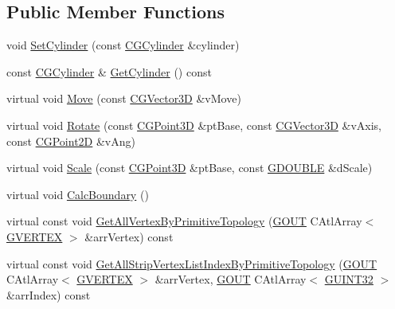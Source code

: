 \subsection*{Public Member Functions}
\begin{DoxyCompactItemize}
\item 
void \hyperlink{class_c_g_object_cylinder_a3e26bc75ed3f1074c950b257f7b0b9af}{Set\+Cylinder} (const \hyperlink{class_c_g_cylinder}{C\+G\+Cylinder} \&cylinder)
\item 
const \hyperlink{class_c_g_cylinder}{C\+G\+Cylinder} \& \hyperlink{class_c_g_object_cylinder_a2919a0a7a51b4e76b765916722580856}{Get\+Cylinder} () const 
\item 
virtual void \hyperlink{class_c_g_object_cylinder_a45bd850435a43f7db3fcfb5dce66aab3}{Move} (const \hyperlink{_g_point3_d_8h_aa7e73d39f4c991acb5a13c84b498366d}{C\+G\+Vector3\+D} \&v\+Move)
\item 
virtual void \hyperlink{class_c_g_object_cylinder_ae9c520523f6383d5632b0254e60c75d6}{Rotate} (const \hyperlink{class_c_g_point3_d}{C\+G\+Point3\+D} \&pt\+Base, const \hyperlink{_g_point3_d_8h_aa7e73d39f4c991acb5a13c84b498366d}{C\+G\+Vector3\+D} \&v\+Axis, const \hyperlink{class_c_g_point2_d}{C\+G\+Point2\+D} \&v\+Ang)
\item 
virtual void \hyperlink{class_c_g_object_cylinder_a834e94a7629f467684e3809612a00277}{Scale} (const \hyperlink{class_c_g_point3_d}{C\+G\+Point3\+D} \&pt\+Base, const \hyperlink{_g_types_8h_afd05ac85f90ee8e2a733928545462cd4}{G\+D\+O\+U\+B\+L\+E} \&d\+Scale)
\item 
virtual void \hyperlink{class_c_g_object_cylinder_a129d8acdb84a92f16b6700d86a57367c}{Calc\+Boundary} ()
\item 
virtual const void \hyperlink{class_c_g_object_cylinder_a807b01245569cc5c94e7a18704d13f10}{Get\+All\+Vertex\+By\+Primitive\+Topology} (\hyperlink{_g_types_8h_a0858ec221262e635612871d70ca233ad}{G\+O\+U\+T} C\+Atl\+Array$<$ \hyperlink{struct_g_v_e_r_t_e_x}{G\+V\+E\+R\+T\+E\+X} $>$ \&arr\+Vertex) const 
\item 
virtual const void \hyperlink{class_c_g_object_cylinder_a28bd9bb95f6bd6503af13af92af99f88}{Get\+All\+Strip\+Vertex\+List\+Index\+By\+Primitive\+Topology} (\hyperlink{_g_types_8h_a0858ec221262e635612871d70ca233ad}{G\+O\+U\+T} C\+Atl\+Array$<$ \hyperlink{struct_g_v_e_r_t_e_x}{G\+V\+E\+R\+T\+E\+X} $>$ \&arr\+Vertex, \hyperlink{_g_types_8h_a0858ec221262e635612871d70ca233ad}{G\+O\+U\+T} C\+Atl\+Array$<$ \hyperlink{_g_types_8h_a2e1a1c77d1349057202e2f34e071019c}{G\+U\+I\+N\+T32} $>$ \&arr\+Index) const 

\end{DoxyCompactItemize}
